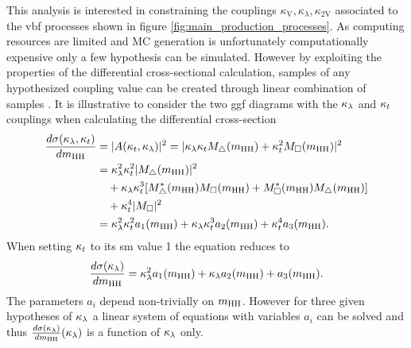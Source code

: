 This analysis is interested in constraining the couplings $\kappa_\text{V},\kappa_\lambda,\kappa_\text{2V}$ associated to the \ac{vbf} processes shown in figure \ref{fig:main_production_processes}. As computing resources are limited and MC generation is unfortunately computationally expensive only a few hypothesis can be simulated. However by exploiting the properties of the differential cross-sectional calculation, samples of any hypothesized coupling value can be created through linear combination of samples \citep{ATLAS-CONF-2019-049}. It is illustrative to consider the two \ac{ggf} diagrams with the $\kappa_\lambda$ and $\kappa_t$ couplings when calculating the differential cross-section
\begin{align}
    \label{eqn:ggf_hh_feynSum}
    \frac{d\sigma(\kappa_\lambda, \kappa_t)}{d m_\text{HH}} & =
    | A(\kappa_t, \kappa_\lambda) |^2 = | \kappa_\lambda \kappa_t M_{\bigtriangleup}(m_\text{HH}) + \kappa_t^2 M_{\Box}(m_\text{HH}) |^2                                                                                                                                          \\
                                     & = \kappa_\lambda^2 \kappa_t^2 |M_{\bigtriangleup}(m_\text{HH})|^2                                                                                                                                              \\ & \quad+
    \kappa_\lambda \kappa_t^3 [ M_{\bigtriangleup}^*(m_\text{HH}) M_{\Box}(m_\text{HH})                                                              +                                                           M_{\Box}^*(m_\text{HH}) M_{\bigtriangleup}(m_\text{HH}) ] \\ &\quad +
    \kappa_t^4 |M_{\Box}|^2                                                                                                                                                                                                         \\
                                     & = \kappa_\lambda^2 \kappa_t^2 a_1(m_\text{HH}) + \kappa_\lambda \kappa_t^3 a_2(m_\text{HH}) + \kappa_t^4 a_3(m_\text{HH}).
\end{align}
When setting $\kappa_t$ to its \ac{sm} value 1 the equation reduces to
\begin{equation}
    \label{eqn:ggf_hh_feynSimple}
    \frac{d\sigma(\kappa_\lambda)}{d m_\text{HH}} = \kappa_\lambda^2 a_1(m_\text{HH}) + \kappa_\lambda a_2(m_\text{HH}) + a_3(m_\text{HH}).
\end{equation}
The parameters $a_i$ depend non-trivially on $m_\text{HH}$. However for three given hypotheses of $\kappa_\lambda$ a linear system of equations with variables $a_i$ can be solved and thus $\frac{d\sigma(\kappa_\lambda)}{d m_\text{HH}}(\kappa_\lambda)$ is a function of $\kappa_\lambda$ only.

